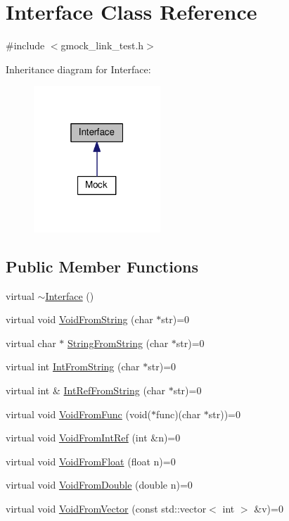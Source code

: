 \hypertarget{classInterface}{}\section{Interface Class Reference}
\label{classInterface}


{\ttfamily \#include $<$gmock\+\_\+link\+\_\+test.\+h$>$}



Inheritance diagram for Interface\+:\nopagebreak
\begin{figure}[H]
\begin{center}
\leavevmode
\includegraphics[width=135pt]{classInterface__inherit__graph}
\end{center}
\end{figure}
\subsection*{Public Member Functions}
\begin{DoxyCompactItemize}
\item 
virtual \hyperlink{classInterface_a67eca71a4ef8d28dc959dd495e2b2b59}{$\sim$\+Interface} ()
\item 
virtual void \hyperlink{classInterface_a65d6ae604e7e9a513aec72c9c94e0b97}{Void\+From\+String} (char $\ast$str)=0
\item 
virtual char $\ast$ \hyperlink{classInterface_a756b1d22c12aa3f14a5083f90043fbf0}{String\+From\+String} (char $\ast$str)=0
\item 
virtual int \hyperlink{classInterface_ab34c8a5fd2236a6b009f86a4e5851b61}{Int\+From\+String} (char $\ast$str)=0
\item 
virtual int \& \hyperlink{classInterface_ab93276de67e60c44fd775d4c139aa8e1}{Int\+Ref\+From\+String} (char $\ast$str)=0
\item 
virtual void \hyperlink{classInterface_a7dab3c82b857a9a5f52b3ce6f7df547f}{Void\+From\+Func} (void($\ast$func)(char $\ast$str))=0
\item 
virtual void \hyperlink{classInterface_aa43fb56650a57b6b3e7743e54e50cb86}{Void\+From\+Int\+Ref} (int \&n)=0
\item 
virtual void \hyperlink{classInterface_ae2b3e9411c893a45642d3af632752c66}{Void\+From\+Float} (float n)=0
\item 
virtual void \hyperlink{classInterface_aa56524017aabdbe46510648c711ab8a8}{Void\+From\+Double} (double n)=0
\item 
virtual void \hyperlink{classInterface_ae84fe7e53f881db2f823ad35d004927a}{Void\+From\+Vector} (const std\+::vector$<$ int $>$ \&v)=0
\end{DoxyCompactItemize}


